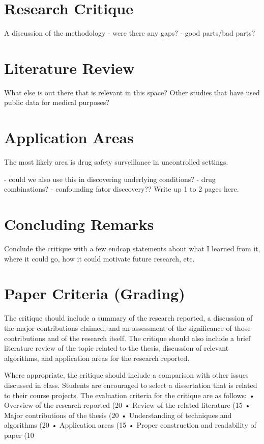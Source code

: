 \documentclass[twoside,11pt]{article}
\begin{document}
\section{Research Critique}
A discussion of the methodology
- were there any gaps?
- good parts/bad parts?



\section{Literature Review}
What else is out there that is relevant in this space?  Other studies
that have used public data for medical purposes?



\section{Application Areas}
The most likely area is drug safety surveillance in uncontrolled settings.

- could we also use this in discovering underlying conditions?
- drug combinations?
- confounding fator disccovery??
Write up 1 to 2 pages here.


\section{Concluding Remarks}
Conclude the critique with a few endcap statements about what I learned from it,
where it could go, how it could motivate future research, etc.


\section{Paper Criteria (Grading)}
The critique should include a summary of the research reported, a discussion of the major contributions
claimed, and an assessment of the significance of those contributions and of the research itself. The
critique should also include a brief literature review of the topic related to the thesis, discussion of relevant
algorithms, and application areas for the research reported.

Where appropriate, the critique should
include a comparison with other issues discussed in class. Students are encouraged to select a
dissertation that is related to their course projects.
The evaluation criteria for the critique are as follows:
• Overview of the research reported (20%
• Review of the related literature (15%
• Major contributions of the thesis (20%
• Understanding of techniques and algorithms (20%
• Application areas (15%
• Proper construction and readability of paper (10%
\end{document}
